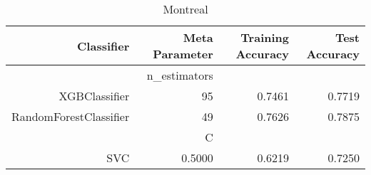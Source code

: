 
\begin{table}[H]
    \caption{Montreal}
    \centering
    \begin{tabular}{|r|r|r|r|}
        \hline
        Classifier &Meta Parameter &Training Accuracy
        &Test Accuracy\\
        \hline
        &n\_estimators &\multicolumn{2}{|r|}{}\\
        \hline
        XGBClassifier &95 &0.7461 &0.7719\\
        \hline
        RandomForestClassifier &49 &0.7626 &0.7875\\
        \hline
        &C &\multicolumn{2}{|r|}{}\\
        \hline
        SVC &0.5000 &0.6219 &0.7250\\
        \hline
    \end{tabular}
\end{table}
